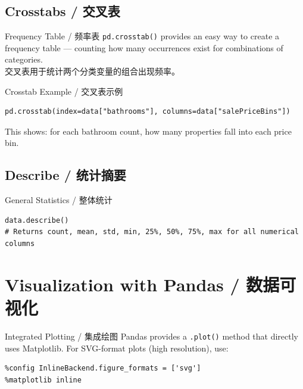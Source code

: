\documentclass[11pt,a4paper]{article}
\begin{document}
\subsection{Crosstabs / 交叉表}

\begin{concept}{Frequency Table / 频率表}
    \texttt{pd.crosstab()} provides an easy way to create a frequency table — counting how many occurrences exist for combinations of categories. \\
    交叉表用于统计两个分类变量的组合出现频率。
\end{concept}

\begin{examplebox}{Crosstab Example / 交叉表示例}
\begin{lstlisting}
pd.crosstab(index=data["bathrooms"], columns=data["salePriceBins"])
\end{lstlisting}
    This shows: for each bathroom count, how many properties fall into each price bin.
\end{examplebox}

\subsection{Describe / 统计摘要}

\begin{examplebox}{General Statistics / 整体统计}
\begin{lstlisting}
data.describe()
# Returns count, mean, std, min, 25%, 50%, 75%, max for all numerical columns
\end{lstlisting}
\end{examplebox}

\section{Visualization with Pandas / 数据可视化}

\begin{concept}{Integrated Plotting / 集成绘图}
    Pandas provides a \texttt{.plot()} method that directly uses Matplotlib. For SVG-format plots (high resolution), use:
\begin{lstlisting}
%config InlineBackend.figure_formats = ['svg']
%matplotlib inline
\end{lstlisting}
\end{concept}
\end{document}
